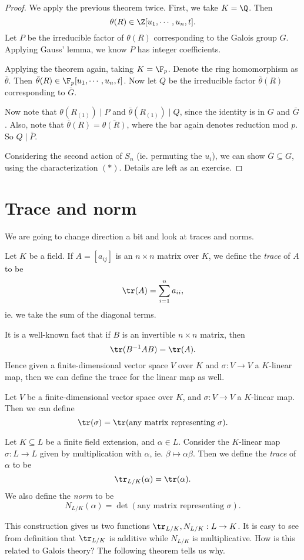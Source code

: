 \documentclass[a4paper]{article}
\begin{document}
\begin{proof}
  We apply the previous theorem twice. First, we take $K = \Q$. Then
  \[
    \theta(R) \in \Z[u_1, \cdots, u_n, t].
  \]
  Let $P$ be the irreducible factor of $\theta(R)$ corresponding to the Galois group $G$. Applying Gauss' lemma, we know $P$ has integer coefficients.

  Applying the theorem again, taking $K = \F_p$. Denote the ring homomorphism as $\bar{\theta}$. Then $\bar{\theta}(R) \in \F_p[u_1, \cdots, u_n, t]$. Now let $Q$ be the irreducible factor $\bar{\theta}(R)$ corresponding to $\bar{G}$.

  Now note that $\theta(R_{(1)}) \mid P$ and $\bar{\theta}(R_{(1)}) \mid Q$, since the identity is in $G$ and $\bar{G}$. Also, note that $\bar{\theta}(R) = \overline{\theta(R)}$, where the bar again denotes reduction mod $p$. So $Q \mid \bar{P}$.

  Considering the second action of $S_n$ (ie. permuting the $u_i$), we can show $\bar{G} \subseteq G$, using the characterization $(*)$. Details are left as an exercise.
\end{proof}
\section{Trace and norm}
We are going to change direction a bit and look at traces and norms.

\begin{defi}[Trace]
  Let $K$ be a field. If $A = [a_{ij}]$ is an $n \times n$ matrix over $K$, we define the \emph{trace} of $A$ to be
  \[
    \tr (A) = \sum_{i = 1}^n a_{ii},
  \]
  ie. we take the sum of the diagonal terms.
\end{defi}

It is a well-known fact that if $B$ is an invertible $n \times n$ matrix, then
\[
  \tr (B^{-1} AB) = \tr (A).
\]
Hence given a finite-dimensional vector space $V$ over $K$ and $\sigma: V \to V$ a $K$-linear map, then we can define the trace for the linear map as well.
\begin{defi}
  Let $V$ be a finite-dimensional vector space over $K$, and $\sigma: V \to V$ a $K$-linear map. Then we can define
  \[
    \tr (\sigma) = \tr(\text{any matrix representing }\sigma).
  \]
\end{defi}

\begin{defi}
  Let $K \subseteq L$ be a finite field extension, and $\alpha \in L$. Consider the $K$-linear map $\sigma: L \to L$ given by multiplication with $\alpha$, ie. $\beta \mapsto \alpha\beta$. Then we define the \emph{trace} of $\alpha$ to be
  \[
    \tr_{L/K}(\alpha) = \tr(\alpha).
  \]
  We also define the \emph{norm} to be
  \[
    N_{L/K}(\alpha) = \det(\text{any matrix representing }\sigma).
  \]
\end{defi}
This construction gives us two functions $\tr_{L/K}, N_{L/K}: L \to K$. It is easy to see from definition that $\tr_{L/K}$ is additive while $N_{L/K}$ is multiplicative. How is this related to Galois theory? The following theorem tells us why.
\end{document}
